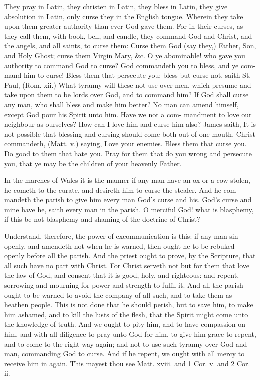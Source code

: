 \documentclass{custom}
\begin{document}
They pray in Latin, they christen in Latin, they bless 
in Latin, they give absolution in Latin, only curse they 
in the English tongue. Wherein they take upon them 
greater authority than ever God gave them. For in their 
curses, as they call them, with book, bell, and candle, 
they command God and Christ, and the angels, and all 
saints, to curse them: Curse them God (say they,) Father, 
Son, and Holy Ghost; curse them Virgin Mary, &c. O 
ye abominable! who gave you authority to command God 
to curse? God commandeth you to bless, and ye com- 
mand him to curse! Bless them that persecute you: 
bless but curse not, saith St. Paul, (Rom. xii.) What 
tyranny will these not use over men, which presume and 
take upon them to be lords over God, and to command 
him? If God shall curse any man, who shall bless and 
make him better? No man can amend himself, except 
God pour his Spirit unto him. Have we not a com- 
mandment to love our neighbour as ourselves? How can 
I love him and curse him also? James saith, It is not 
possible that blessing and cursing should come both out of 
one mouth. Christ commandeth, (Matt. v.) saying, Love 
your enemies. Bless them that curse you. Do good to 
them that hate you. Pray for them that do you wrong 
and persecute you, that ye may be the children of your 
heavenly Father. 

In the marches of Wales it is the manner if any man 
have an ox or a cow stolen, he cometh to the curate, 
and desireth him to curse the stealer. And he com- 
mandeth the parish to give him every man God's curse and 
his. God's curse and mine have he, saith every man in 
the parish. O merciful God! what is blasphemy, if 
this be not blasphemy and shaming of the doctrine of 
Christ? 

Understand, therefore, the power of excommunication 
is this: if any man sin openly, and amendeth not when 
he is warned, then ought he to be rebuked openly before 
all the parish. And the priest ought to prove, by the 
Scripture, that all such have no part with Christ. For 
Christ serveth not but for them that love the law of God, 
and consent that it is good, holy, and righteous: and 
repent, sorrowing and mourning for power and strength 
to fulfil it. And all the parish ought to be warned to 
avoid the company of all such, and to take them as 
heathen people. This is not done that he should perish, 
but to save him, to make him ashamed, and to kill the 
lusts of the flesh, that the Spirit might come unto the 
knowledge of truth. And we ought to pity him, and to 
have compassion on him, and with all diligence to pray 
unto God for him, to give him grace to repent, and to 
come to the right way again; and not to use such tyranny 
over God and man, commanding God to curse. And if 
he repent, we ought with all mercy to receive him in 
again. This mayest thou see Matt. xviii. and 1 Cor. v. 
and 2 Cor. ii. 
\end{document}
